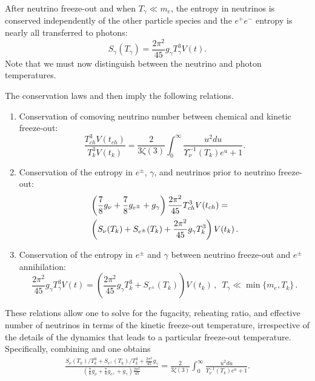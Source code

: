 After neutrino freeze-out and when $T_{\gamma}\ll m_e$, the entropy in neutrinos is conserved independently of the other particle species and the $e^+e^-$ entropy is nearly all transferred to photons:
\begin{equation}
S_{\gamma}(T_\gamma)=\frac{2 \pi^2}{45}g_\gamma T_{\gamma}^3 V(t).
\end{equation}
 Note that we must now distinguish between the neutrino and photon temperatures.

The conservation laws  and  then imply the following relations.
\begin{enumerate}
\item Conservation of comoving neutrino number between chemical and kinetic freeze-out:
\begin{equation}\label{modindeq1}
\frac{T_{ch}^3V(t_{ch})}{T_k^3V(t_k)}=\frac{2}{3\zeta(3)}\int_0^\infty \frac{u^2 du}{\Upsilon_\nu^{-1}(T_k)e^u+1}.
\end{equation}
\item Conservation of the entropy in $e^\pm$, $\gamma$, and neutrinos prior to neutrino freeze-out:
\begin{align}\label{modindeq2}
&\left(\frac{7}{8}g_\nu+\frac{7}{8}g_{e^\pm} +g_\gamma \right)\frac{2\pi^2}{45} T_{ch}^3V(t_{ch})=\\
&\left(S_{\nu}(T_k)+S_{e^\pm}(T_k)+\frac{2\pi^2}{45}g_\gamma T_k^3\right)V(t_k)\,.\notag
\end{align}
\item Conservation of the entropy in $e^\pm$ and $\gamma$ between neutrino freeze-out and $e^\pm$ annihilation:
\begin{equation}\label{modindeq3}
\frac{2 \pi^2}{45}g_\gamma T_{\gamma}^3 V(t)=\left(\frac{2\pi^2}{45}g_\gamma T_k^3+S_{e^\pm}(T_k)\right)V(t_k)\,, \,\,\, T_\gamma\ll \min\{m_e, T_k\}\,.
\end{equation}
\end{enumerate}

These relations allow one to solve for the fugacity, reheating ratio, and effective number of neutrinos in terms of the kinetic freeze-out temperature, irrespective of the details of the dynamics that leads to a particular freeze-out temperature. Specifically, combining  and  one obtains
\begin{align}
 \frac{S_{\nu}(T_k)/T_k^3+S_{e^\pm}(T_k)/T_k^3+\frac{2\pi^2}{45}g_\gamma }{\left(\frac{7}{8}g_\nu+\frac{7}{8}g_{e^\pm} +g_\gamma \right)\frac{2\pi^2}{45} }=\frac{2}{3\zeta(3)}\int_0^\infty \frac{u^2 du}{\Upsilon_\nu^{-1}(T_k)e^u+1}.
\end{align}

